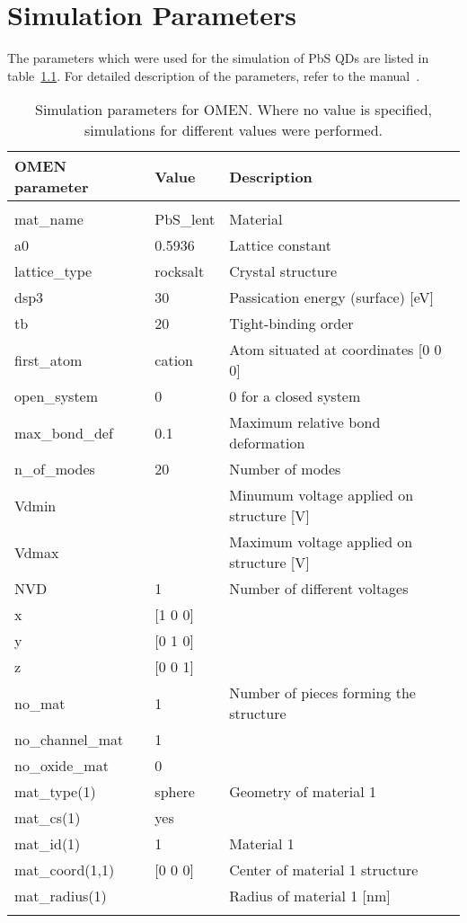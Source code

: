 \chapter{Simulation Parameters}
\label{A}

The parameters which were used for the simulation of PbS QDs are listed in table~\ref{table:SimParams}. For detailed description of the \omen parameters, refer to the \omen manual~\cite{OMENmanual}.
\begin{table}
\centering
\begin{tabular}{l l l}
	OMEN parameter & Value & Description\\
	\hline
	\\
	mat\_name		& PbS\_lent	& Material \\
	a0				& 0.5936	& Lattice constant \\
	lattice\_type	& rocksalt	& Crystal structure \\
	dsp3 			& 30		& Passication energy (surface) [eV] \\
	tb				& 20		& Tight-binding order \\
	first\_atom 	& cation 	& Atom situated at  coordinates [0 0 0] \\
	open\_system 	& 0 		& 0 for a closed system\\
	max\_bond\_def 	& 0.1 		& Maximum relative bond deformation \\
	n\_of\_modes	& 20		& Number of modes \\
	Vdmin			& 			& Minumum voltage applied on structure [V] \\
	Vdmax			& 			& Maximum voltage applied on structure [V] \\
	NVD				& 1			& Number of different voltages \\
	x				& [1 0 0]	& \\
	y				& [0 1 0] 	& \\
	z				& [0 0 1]	& \\
	no\_mat 		& 1			& Number of pieces forming the structure\\
	no\_channel\_mat& 1			&  \\
	no\_oxide\_mat 	& 0			&  \\
	mat\_type(1)	& sphere	& Geometry of material 1 \\
	mat\_cs(1)		& yes		& \\
	mat\_id(1)		& 1			& Material 1 \\
	mat\_coord(1,1)	& [0 0 0]	& Center of material 1 structure \\
	mat\_radius(1)	& 			& Radius of material 1 [nm] \\\\
\end{tabular}
\caption{Simulation parameters for OMEN. Where no value is specified, simulations for different values were performed.}
\label{table:SimParams}
\end{table}